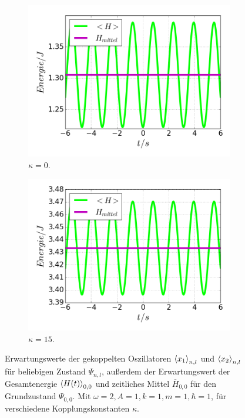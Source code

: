 \begin{figure}
\begin{subfigure}[t]{0.5\textwidth}
        \includegraphics[width=\textwidth]{plots/<H>00_kappa0.png}
        \caption{$\kappa=0$.}
        \label{fig:H_kappa0}
      \end{subfigure}
      \begin{subfigure}[t]{0.5\textwidth}
          \centering
          \includegraphics[width=\textwidth]{plots/<H>00_kappa15.png}
          \caption{$\kappa=15$.}
          \label{fig:H_kappa15}
      \end{subfigure}
      \caption{Erwartungswerte der gekoppelten Oszillatoren $\braket{x_1}_{n,l}$ und $\braket{x_2}_{n,l}$ für beliebigen Zustand $\Psi_{n,l}$, außerdem der Erwartungswert der Gesamtenergie $\braket{H(t)}_{0,0}$ und zeitliches Mittel $\overline{H}_{0,0}$ für den Grundzustand $\Psi_{0,0}$. Mit $\omega=2 , A=1 , k=1 , m=1 , \hbar=1$, für verschiedene Kopplungskonstanten $\kappa$.}
    \end{figure}
\fi

